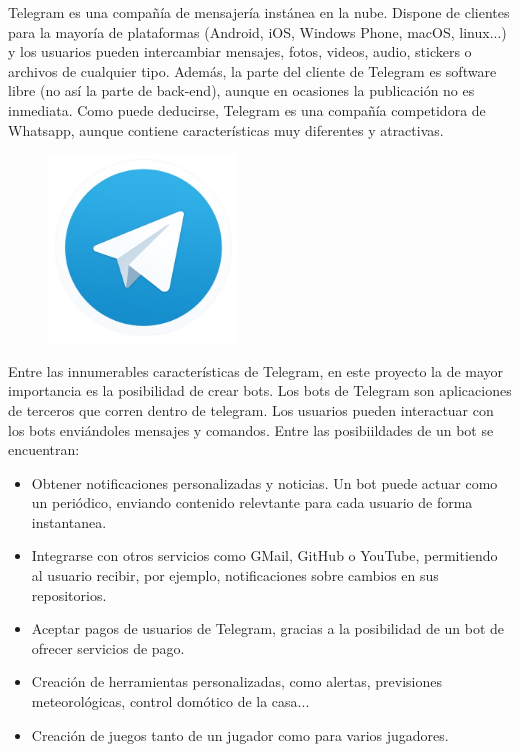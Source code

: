 Telegram es una compañía de mensajería instánea en la nube. Dispone de clientes para la mayoría de plataformas (Android, iOS, Windows Phone, macOS, linux...) y los usuarios pueden intercambiar mensajes, fotos, videos, audio, stickers o archivos de cualquier tipo. Además, la parte del cliente de Telegram es software libre (no así la parte de back-end), aunque en ocasiones la publicación no es inmediata. Como puede deducirse, Telegram es una compañía competidora de Whatsapp, aunque contiene características muy diferentes y atractivas.\\
\begin{figure}[H]
    \centering
    \captionsetup{width=7cm}
    \includegraphics[width=5cm]{contenido/imagenes/Telegram-logo.jpg}
\end{figure}
Entre las innumerables características de Telegram, en este proyecto la de mayor importancia es la posibilidad de crear bots. Los bots de Telegram son aplicaciones de terceros que corren dentro de telegram. Los usuarios pueden interactuar con los bots enviándoles mensajes y comandos. Entre las posibiildades de un bot se encuentran:
\begin{itemize}
    \item Obtener notificaciones personalizadas y noticias. Un bot puede actuar como un periódico, enviando contenido relevtante para cada usuario de forma instantanea.
    \item Integrarse con otros servicios como GMail, GitHub o YouTube, permitiendo al usuario recibir, por ejemplo, notificaciones sobre cambios en sus repositorios.
    \item Aceptar pagos de usuarios de Telegram, gracias a la posibilidad de un bot de ofrecer servicios de pago.
    \item Creación de herramientas personalizadas, como alertas, previsiones meteorológicas, control domótico de la casa...
    \item Creación de juegos tanto de un jugador como para varios jugadores.
\end{itemize}

